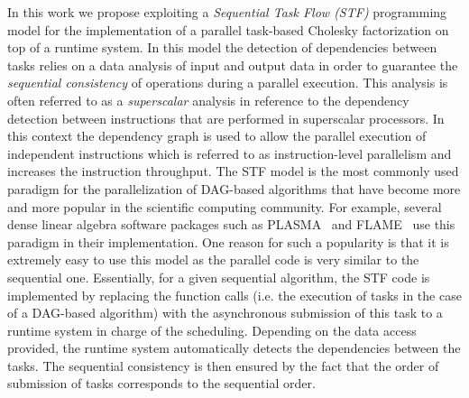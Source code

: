 \documentclass{article}
\begin{document}
In this work we propose exploiting a \textit{Sequential Task Flow
  (STF)} programming model for the implementation of a parallel
task-based Cholesky factorization on top of a runtime system. In this
model the detection of dependencies between tasks relies on a data
analysis of input and output data in order to guarantee the
\textit{sequential consistency} of operations during a parallel
execution. This analysis is often referred to as a
\textit{superscalar} analysis in reference to the dependency detection
between instructions that are performed in superscalar processors. In
this context the dependency graph is used to allow the parallel
execution of independent instructions which is referred to as
instruction-level parallelism and increases the instruction
throughput. The STF model is the most commonly used paradigm for the
parallelization of DAG-based algorithms that have become more and more
popular in the scientific computing community. For example, several
dense linear algebra software packages such as
PLASMA~\cite{a.d.d.h.ea:09} and FLAME~\cite{i.c.q.q.ea:12} use this
paradigm in their implementation. One reason for such a popularity is
that it is extremely easy to use this model as the parallel code is
very similar to the sequential one. Essentially, for a given
sequential algorithm, the STF code is implemented by replacing the
function calls (i.e. the execution of tasks in the case of a DAG-based
algorithm) with the asynchronous submission of this task to a runtime
system in charge of the scheduling. Depending on the data access
provided, the runtime system automatically detects the dependencies
between the tasks. The sequential consistency is then ensured by the
fact that the order of submission of tasks corresponds to the
sequential order.
\end{document}
